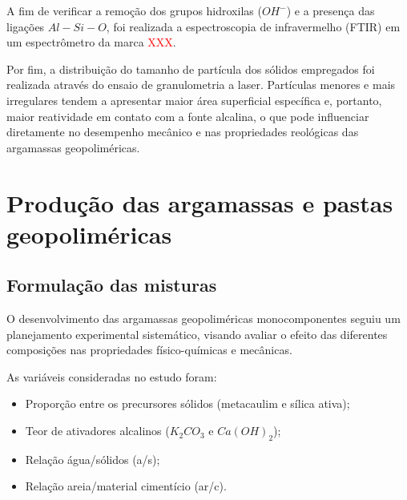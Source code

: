 A fim de verificar a remoção dos grupos hidroxilas ($OH^-$) e a presença das ligações $Al-Si-O$, foi realizada a espectroscopia de infravermelho (FTIR) em um espectrômetro da marca \textcolor{red}{XXX}.

Por fim, a distribuição do tamanho de partícula dos sólidos empregados foi realizada através do ensaio de granulometria a laser. Partículas menores e mais irregulares tendem a apresentar maior área superficial específica e, portanto, maior reatividade em contato com a fonte alcalina, o que pode influenciar diretamente no desempenho mecânico e nas propriedades reológicas das argamassas geopoliméricas.


\section{Produção das argamassas e pastas geopoliméricas}
\label{sec:producao_das_argamassas_e_pastas_geopolimericas}

\subsection{Formulação das misturas}
\label{subsec:formulacao_das_misturas}

O desenvolvimento das argamassas geopoliméricas monocomponentes seguiu um planejamento experimental sistemático, visando avaliar o efeito das diferentes composições nas propriedades físico-químicas e mecânicas.

As variáveis consideradas no estudo foram:

\begin{itemize}
    \item Proporção entre os precursores sólidos (metacaulim e sílica ativa);
    \item Teor de ativadores alcalinos ($K_2CO_3$ e $Ca(OH)_2$);
    \item Relação água/sólidos (a/s);
    \item Relação areia/material cimentício (ar/c).
\end{itemize}

